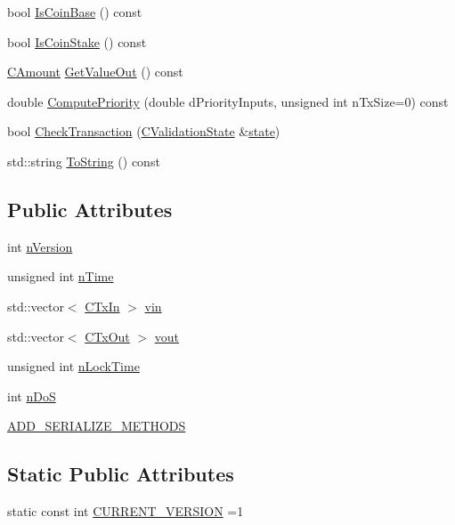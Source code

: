 \begin{DoxyCompactItemize}
bool \hyperlink{class_c_transaction_a274384ecbb50d71355cd287b7a6bca51}{Is\+Coin\+Base} () const 
\item 
bool \hyperlink{class_c_transaction_a8d924e18ddcf4c31bc7483b3a157113d}{Is\+Coin\+Stake} () const 
\item 
\hyperlink{amount_8h_a4eaf3a5239714d8c45b851527f7cb564}{C\+Amount} \hyperlink{class_c_transaction_aef472df5cb11c53281d975ee9e7cf133}{Get\+Value\+Out} () const 
\item 
double \hyperlink{class_c_transaction_ad2452fe2ae424f43e5fd767c28517b3b}{Compute\+Priority} (double d\+Priority\+Inputs, unsigned int n\+Tx\+Size=0) const 
\item 
bool \hyperlink{class_c_transaction_afa2875bea30d31900a30baf7fd56b96b}{Check\+Transaction} (\hyperlink{class_c_validation_state}{C\+Validation\+State} \&\hyperlink{version__set_8cc_a6aad002d0db5e5e85dc31927a5a6f503}{state})
\item 
std\+::string \hyperlink{class_c_transaction_ae5fde44ffb46045dd48bd9cfff9492b6}{To\+String} () const 
\end{DoxyCompactItemize}
\subsection*{Public Attributes}
\begin{DoxyCompactItemize}
\item 
int \hyperlink{class_c_transaction_a6c29bdd822859c7b21b7b6c22dca6825}{n\+Version}
\item 
unsigned int \hyperlink{class_c_transaction_a8ccb4b6020669bc562095e3417715e41}{n\+Time}
\item 
std\+::vector$<$ \hyperlink{class_c_tx_in}{C\+Tx\+In} $>$ \hyperlink{class_c_transaction_a53fa787e4ea57374b4fa2a28e9a957b2}{vin}
\item 
std\+::vector$<$ \hyperlink{class_c_tx_out}{C\+Tx\+Out} $>$ \hyperlink{class_c_transaction_ae42c0032a464c3054c508017c7d040ef}{vout}
\item 
unsigned int \hyperlink{class_c_transaction_ab01e4e451d2f3f84b01380979c8fdacc}{n\+Lock\+Time}
\item 
int \hyperlink{class_c_transaction_a2a1fd6929add85d3df299249da78d015}{n\+Do\+S}
\item 
\hyperlink{class_c_transaction_a329b40b323445b322ab460c966669944}{A\+D\+D\+\_\+\+S\+E\+R\+I\+A\+L\+I\+Z\+E\+\_\+\+M\+E\+T\+H\+O\+D\+S}
\end{DoxyCompactItemize}
\subsection*{Static Public Attributes}
\begin{DoxyCompactItemize}
\item 
static const int \hyperlink{class_c_transaction_aa728c112d5cdd174ee156a67107f1cf4}{C\+U\+R\+R\+E\+N\+T\+\_\+\+V\+E\+R\+S\+I\+O\+N} =1
\end{DoxyCompactItemize}
